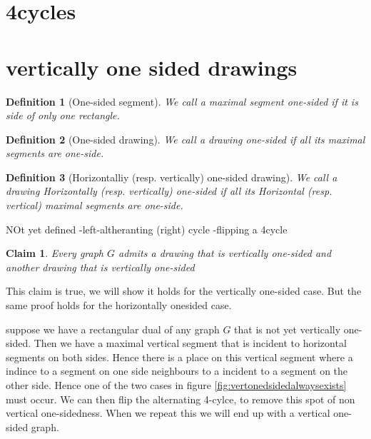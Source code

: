 \documentclass[a4paper]{article}
\title{}
\author{Sander Beekhuis, nr: 0972717}
\date{\today} %
\newtheorem{claim}{Claim}
\newtheorem{defi}{Definition}
\begin{document}
\maketitle


\section{4cycles}


\section{vertically one sided drawings}

\begin{defi}[One-sided segment]
We call a maximal segment one-sided if it is side of only one rectangle.
\end{defi}

\begin{defi}[One-sided drawing]
We call a drawing one-sided if all its maximal segments are one-side.
\end{defi}

\begin{defi}[Horizontalliy (resp. vertically) one-sided drawing]
We call a drawing Horizontally (resp. vertically)  one-sided if all its Horizontal (resp. vertical)  maximal segments are one-side.
\end{defi}

NOt yet defined
-left-altheranting (right) cycle
-flipping a 4cycle


\begin{claim}
Every graph $G$ admits a drawing that is vertically one-sided and another drawing that is vertically one-sided
\end{claim}

This claim is true, we will show it holds for the vertically one-sided case. But the same proof holds for the horizontally onesided case.

suppose we have a rectangular dual of any graph $G$ that is not yet vertically one-sided. Then we have a maximal vertical segment that is incident to horizontal segments on both sides. Hence there is a place on this vertical segment where a indince to a segment on one side neighbours to a incident to a segment on the other side. Hence one of the two cases in figure \ref{fig:vertonedsidedalwaysexists} must occur. We can then flip the alternating 4-cylce, to remove this spot of non vertical one-sidedness. When we repeat this we will end up with a vertical one-sided graph.  %
\end{document}
